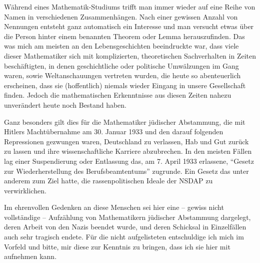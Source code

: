 Während eines Mathematik-Studiums trifft man immer wieder auf eine Reihe von Namen in verschiedenen Zusammenhängen. Nach einer gewissen Anzahl von Nennungen entsteht ganz automatisch ein Interesse und man versucht etwas über die Person hinter einem benannten Theorem oder Lemma herauszufinden. Das was mich am meisten an den Lebensgeschichten beeindruckte war, dass viele dieser Mathematiker sich mit komplizierten, theoretischen Sachverhalten in Zeiten beschäftigten, in denen geschichtliche oder politische Umwälzungen im Gang waren, sowie Weltanschauungen vertreten wurden, die heute so abenteuerlich erscheinen, dass sie (hoffentlich) niemals wieder Eingang in unsere Gesellschaft finden. Jedoch die mathematischen Erkenntnisse aus diesen Zeiten nahezu unverändert heute noch Bestand haben. 

Ganz besonders gilt dies für die Mathematiker jüdischer Abstammung, die mit Hitlers Machtübernahme am 30. Januar 1933 und den darauf folgenden Repressionen gezwungen waren, Deutschland zu verlassen, Hab und Gut zurück zu lassen und ihre wissenschaftliche Karriere abzubrechen. In den meisten Fällen lag einer Suspendierung oder Entlassung das, am 7. April 1933 erlassene, "`Gesetz zur Wiederherstellung des Berufsbeamtentums"' zugrunde. Ein Gesetz das unter anderem zum Ziel hatte, die rassenpolitischen Ideale der NSDAP zu verwirklichen. 

Im ehrenvollen Gedenken an diese Menschen sei hier eine -- gewiss nicht vollständige -- Aufzählung von Mathematikern jüdischer Abstammung dargelegt, deren Arbeit von den Nazis beendet wurde, und deren Schicksal in Einzelfällen auch sehr tragisch endete. Für die nicht aufgelisteten entschuldige ich mich im Vorfeld und bitte, mir diese zur Kenntnis zu bringen, dass ich sie hier mit aufnehmen kann.


